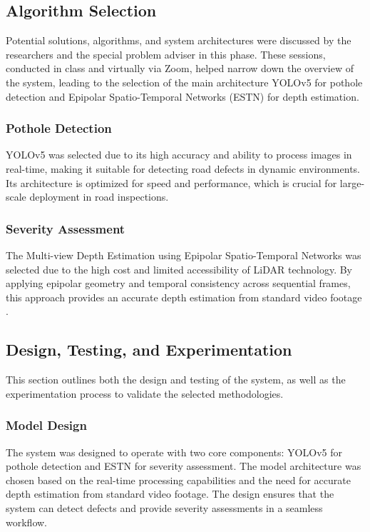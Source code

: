 \subsection{\textbf{Algorithm Selection } }
Potential solutions, algorithms, and system architectures were discussed by the researchers and the special problem adviser in this phase. These sessions, conducted in class and virtually via Zoom, helped narrow down the overview of the system, leading to the selection of the main architecture YOLOv5 for pothole detection and Epipolar Spatio-Temporal Networks (ESTN) for depth estimation. 

\subsubsection{Pothole Detection}
YOLOv5 was selected due to its high accuracy and ability to process images in real-time, making it suitable for detecting road defects in dynamic environments. Its architecture is optimized for speed and performance, which is crucial for large-scale deployment in road inspections. 

\subsubsection{Severity Assessment}
The Multi-view Depth Estimation using Epipolar Spatio-Temporal Networks was selected due to the high cost and limited accessibility of LiDAR technology. By applying epipolar geometry and temporal consistency across sequential frames, this approach provides an accurate depth estimation from standard video footage \cite{long2021}. 

\subsection{\textbf{Design, Testing, and Experimentation} }
This section outlines both the design and testing of the system, as well as the experimentation process to validate the selected methodologies. 

\subsubsection{Model Design}
The system was designed to operate with two core components: YOLOv5 for pothole detection and ESTN for severity assessment. The model architecture was chosen based on the real-time processing capabilities and the need for accurate depth estimation from standard video footage. The design ensures that the system can detect defects and provide severity assessments in a seamless workflow. 

